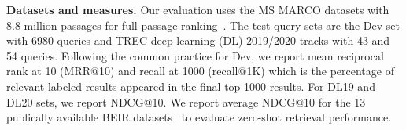{\bf Datasets and measures.}
Our evaluation uses the MS MARCO datasets with 8.8 million passages for full passage ranking~\cite{Campos2016MSMARCO,Craswell2020OverviewOT}. 
The test query sets are the Dev set with 6980 queries and TREC deep learning (DL)  2019/2020 tracks with 43 and 54 queries.
Following the common practice for Dev, 
we report mean reciprocal rank at 10 (MRR@10) and recall at 1000 (recall@1K) 
which is the percentage of relevant-labeled results appeared in the final top-1000 results.
For DL19 and DL20 sets, we report NDCG@10.
We report average NDCG@10 for the 13 publically available BEIR datasets~\cite{thakur2021beir} 
to evaluate  zero-shot retrieval performance. 

